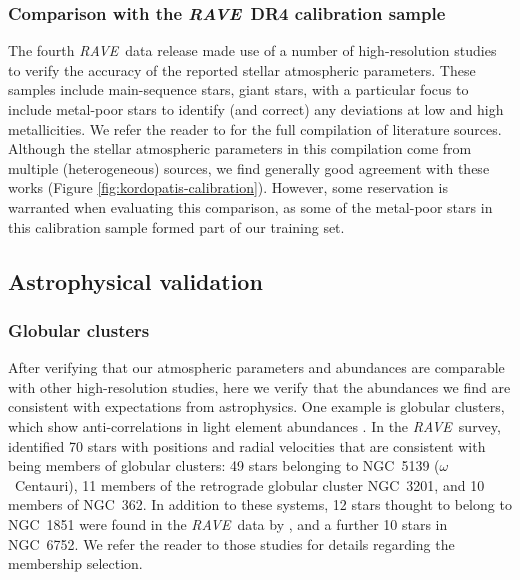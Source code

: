 \documentclass[preprint,trackchanges]{aastex}
\newcommand{\acronym}[1]{{\small{#1}}}
\newcommand{\project}[1]{\textsl{#1}}
\newcommand{\rave}{\project{\acronym{RAVE}}}
\begin{document}
\subsubsection{Comparison with the \rave\ DR4 calibration sample}
\label{sec:dr4-calibration-sample}


The fourth \rave\ data release made use of a number of high-resolution studies
to verify the accuracy of the reported stellar atmospheric parameters.  These
samples include main-sequence stars, giant stars, with a particular focus to
include metal-poor stars to identify (and correct) any deviations at low
and high metallicities.  We refer the reader to \citet{Kordopatis_2013} for
the full compilation of literature sources.  Although the stellar atmospheric 
parameters in this compilation come from multiple (heterogeneous) sources, we 
find generally good agreement with these works (Figure 
\ref{fig:kordopatis-calibration}).  However, some reservation is warranted 
when evaluating this comparison, as some of the metal-poor stars in this 
calibration sample formed part of our training set.  


\subsection{Astrophysical validation}
\label{sec:astrophysical-validation}

\subsubsection{Globular clusters}
\label{sec:globular-cluster-validation}

After verifying that our atmospheric parameters and abundances are comparable with other
high-resolution studies, here we verify that the abundances we find
are consistent with expectations from astrophysics.  One example is globular clusters, 
which show anti-correlations in light element abundances 
\citep[e.g.,][and references therein]{Norris_Da_Costa_1995,Carretta_2009}.  In the \rave\
survey, \cite{Anguiano_2015} identified 70 stars with positions and radial velocities that are
consistent with being members of globular clusters: 49 stars belonging to NGC~5139
($\omega$~Centauri), 11 members of the retrograde globular cluster NGC~3201, and 10 
members of NGC~362. In addition to these systems, 12 stars thought to belong to NGC~1851
were found in the \rave\ data by \cite{Kunder_2014}, and a further 10 stars in NGC~6752.  
We refer the reader to those studies for details regarding the membership selection.
\end{document}
